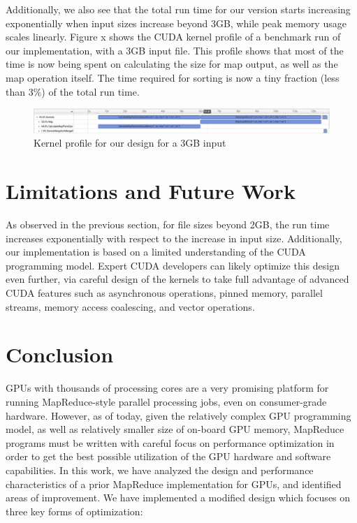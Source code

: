 \documentclass{article}
\begin{document}
Additionally, we also see that the total run time for our version starts increasing exponentially when input sizes increase beyond 3GB, while peak memory usage scales linearly. Figure x shows the CUDA kernel profile of a benchmark run of our implementation, with a 3GB input file. This profile shows that most of the time is now being spent on calculating the size for map output, as well as the map operation itself. The time required for sorting is now a tiny fraction (less than 3\%) of the total run time. 

\begin{figure}
    \centering
    \includegraphics[width=1\linewidth]{images/mr-kernels-3gb.png}
    \caption{Kernel profile for our design for a 3GB input}
    \label{fig:mr-kernels-3gb}
\end{figure}

\section{Limitations and Future Work}
As observed in the previous section, for file sizes beyond 2GB, the run time increases exponentially with respect to the increase in input size. Additionally, our implementation is based on a limited understanding of the CUDA programming model. Expert CUDA developers can likely optimize this design even further, via careful design of the kernels to take full advantage of advanced CUDA features such as asynchronous operations, pinned memory, parallel streams, memory access coalescing, and vector operations.

\section{Conclusion}
GPUs with thousands of processing cores are a very promising platform for running MapReduce-style parallel processing jobs, even on consumer-grade hardware. However, as of today, given the relatively complex GPU programming model, as well as relatively smaller size of on-board GPU memory, MapReduce programs must be written with careful focus on performance optimization in order to get the best possible utilization of the GPU hardware and software capabilities. In this work, we have analyzed the design and performance characteristics of a prior MapReduce implementation for GPUs, and identified areas of improvement. We have implemented a modified design which focuses on three key forms of optimization:
\end{document}
